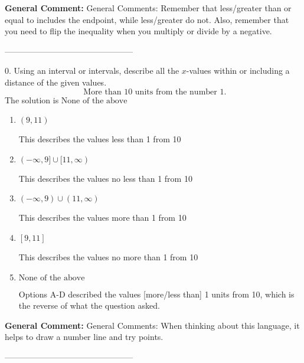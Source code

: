 \documentclass{extbook}[14pt]
\begin{document}
\textbf{General Comment:} General Comments: Remember that less/greater than or equal to includes the endpoint, while less/greater do not. Also, remember that you need to flip the inequality when you multiply or divide by a negative. 

-----------------------------------------------

0. Using an interval or intervals, describe all the $x$-values within or including a distance of the given values.
\[ \text{ More than } 10 \text{ units from the number } 1. \] 
The solution is $ \text{None of the above} $ 

\begin{enumerate}[label=\Alph*.] 
\item $ (9, 11) $ 

 This describes the values less than 1 from 10 
\item $ (-\infty, 9] \cup [11, \infty) $ 

 This describes the values no less than 1 from 10 
\item $ (-\infty, 9) \cup (11, \infty) $ 

 This describes the values more than 1 from 10 
\item $ [9, 11] $ 

 This describes the values no more than 1 from 10 
\item $ \text{None of the above} $ 

 Options A-D described the values [more/less than] 1 units from 10, which is the reverse of what the question asked. 
\end{enumerate} 
 
\textbf{General Comment:} General Comments: When thinking about this language, it helps to draw a number line and try points. 

-----------------------------------------------
\end{document}
